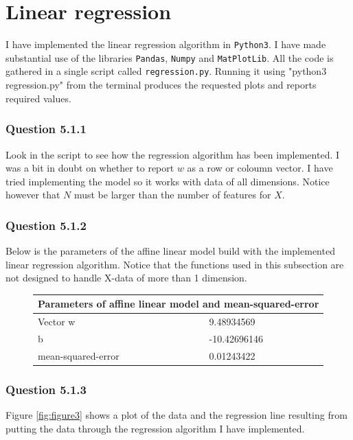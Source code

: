 \documentclass{article}
\begin{document}
\section{Linear regression}
I have implemented the linear regression algorithm in \texttt{Python3}. I have
made substantial use of the libraries \texttt{Pandas}, \texttt{Numpy} and
\texttt{MatPlotLib}. All the code is gathered in a single script called
\texttt{regression.py}. Running it using "python3 regression.py" from the terminal
produces the requested plots and reports required values.

\subsubsection*{Question 5.1.1}
Look in the script to see how the regression algorithm has been implemented. I
was a bit in doubt on whether to report \(w\) as a row or coloumn vector. I have
tried implementing the model so it works with data of all dimensions. Notice
however that \(N\) must be larger than the number of features for \(X\).

\subsubsection*{Question 5.1.2}
Below is the parameters of the affine linear model build with the implemented
linear regression algorithm. Notice that the functions used in this subsection
are not designed to handle X-data of more than 1 dimension.

\begin{figure}[h]
\centering
\begin{tabular}{ |p{7cm}||p{3cm}|  }
 \hline
 \multicolumn{2}{|c|}{Parameters of affine linear model and mean-squared-error}\\
 \hline
 Vector w   & 9.48934569 \\
 b  & -10.42696146 \\
 mean-squared-error & 0.01243422 \\ 
 \hline
\end{tabular}
\end{figure}

\subsubsection*{Question 5.1.3}
Figure \ref{fig:figure3} shows a plot of the data and the regression line
resulting from putting the data through the regression algorithm I have
implemented.
\end{document}
